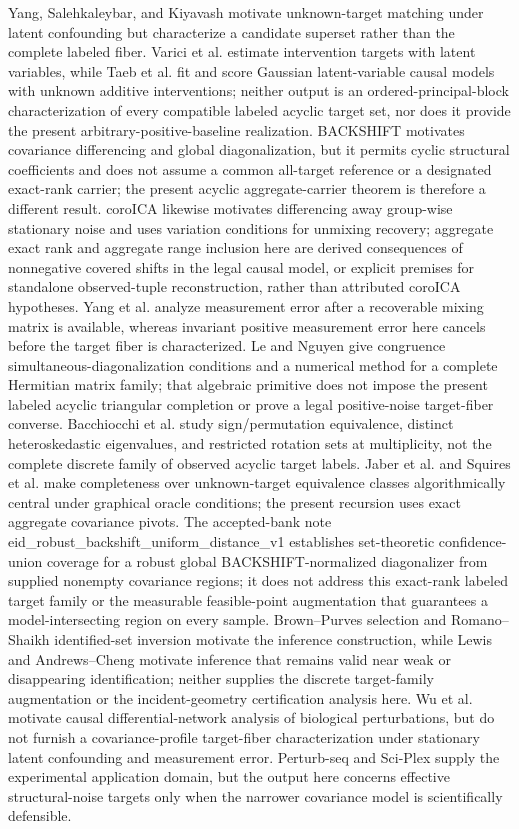 \documentclass{article}
\begin{document}
Yang, Salehkaleybar, and Kiyavash motivate unknown-target matching under latent confounding but characterize a candidate superset rather than the complete labeled fiber.  Varici et al. estimate intervention targets with latent variables, while Taeb et al. fit and score Gaussian latent-variable causal models with unknown additive interventions; neither output is an ordered-principal-block characterization of every compatible labeled acyclic target set, nor does it provide the present arbitrary-positive-baseline realization.  BACKSHIFT motivates covariance differencing and global diagonalization, but it permits cyclic structural coefficients and does not assume a common all-target reference or a designated exact-rank carrier; the present acyclic aggregate-carrier theorem is therefore a different result.  coroICA likewise motivates differencing away group-wise stationary noise and uses variation conditions for unmixing recovery; aggregate exact rank and aggregate range inclusion here are derived consequences of nonnegative covered shifts in the legal causal model, or explicit premises for standalone observed-tuple reconstruction, rather than attributed coroICA hypotheses.  Yang et al. analyze measurement error after a recoverable mixing matrix is available, whereas invariant positive measurement error here cancels before the target fiber is characterized.  Le and Nguyen give congruence simultaneous-diagonalization conditions and a numerical method for a complete Hermitian matrix family; that algebraic primitive does not impose the present labeled acyclic triangular completion or prove a legal positive-noise target-fiber converse.  Bacchiocchi et al. study sign/permutation equivalence, distinct heteroskedastic eigenvalues, and restricted rotation sets at multiplicity, not the complete discrete family of observed acyclic target labels.  Jaber et al. and Squires et al. make completeness over unknown-target equivalence classes algorithmically central under graphical oracle conditions; the present recursion uses exact aggregate covariance pivots.  The accepted-bank note eid\_robust\_backshift\_uniform\_distance\_v1 establishes set-theoretic confidence-union coverage for a robust global BACKSHIFT-normalized diagonalizer from supplied nonempty covariance regions; it does not address this exact-rank labeled target family or the measurable feasible-point augmentation that guarantees a model-intersecting region on every sample.  Brown--Purves selection and Romano--Shaikh identified-set inversion motivate the inference construction, while Lewis and Andrews--Cheng motivate inference that remains valid near weak or disappearing identification; neither supplies the discrete target-family augmentation or the incident-geometry certification analysis here.  Wu et al. motivate causal differential-network analysis of biological perturbations, but do not furnish a covariance-profile target-fiber characterization under stationary latent confounding and measurement error.  Perturb-seq and Sci-Plex supply the experimental application domain, but the output here concerns effective structural-noise targets only when the narrower covariance model is scientifically defensible.
\end{document}
